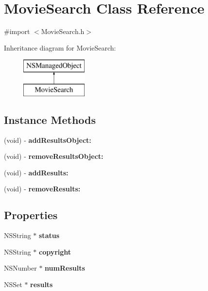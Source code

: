 \section{Movie\+Search Class Reference}
\label{interface_movie_search}


{\ttfamily \#import $<$Movie\+Search.\+h$>$}

Inheritance diagram for Movie\+Search\+:\begin{figure}[H]
\begin{center}
\leavevmode
\includegraphics[height=2.000000cm]{interface_movie_search}
\end{center}
\end{figure}
\subsection*{Instance Methods}
\begin{DoxyCompactItemize}
\item 
(void) -\/ {\bfseries add\+Results\+Object\+:}\label{interface_movie_search_ad257f43478080c09878a24385f01a48d}

\item 
(void) -\/ {\bfseries remove\+Results\+Object\+:}\label{interface_movie_search_a7401bb23bcefebe777d8a4b79eb9a015}

\item 
(void) -\/ {\bfseries add\+Results\+:}\label{interface_movie_search_abd1b460770fe42d72462f45a9bf26ca4}

\item 
(void) -\/ {\bfseries remove\+Results\+:}\label{interface_movie_search_aa712540f1b1ff2a31572cdc507b5bad1}

\end{DoxyCompactItemize}
\subsection*{Properties}
\begin{DoxyCompactItemize}
\item 
N\+S\+String $\ast$ {\bfseries status}\label{interface_movie_search_a0dd14a68168883b5d7b34ed0dbec01ae}

\item 
N\+S\+String $\ast$ {\bfseries copyright}\label{interface_movie_search_a90eed08cd3a30d7faef44529e5e7f0b2}

\item 
N\+S\+Number $\ast$ {\bfseries num\+Results}\label{interface_movie_search_afb60a51971da64446ddfe805a977dadb}

\item 
N\+S\+Set $\ast$ {\bfseries results}\label{interface_movie_search_a1507cae1fff22177bc3b1d4d4b2ca709}

\end{DoxyCompactItemize}


